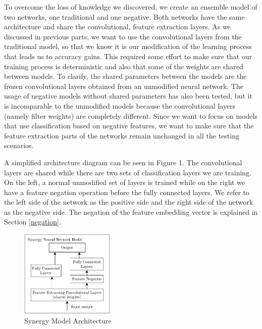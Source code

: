 \documentclass[b5paper]{book}
\begin{document}
To overcome the loss of knowledge we discovered, we create an ensemble model of two networks, one traditional and one negative. Both networks have the same architecture and share the convolutional, feature extraction layers. As we discussed in previous parts, we want to use the convolutional layers from the traditional model, so that we know it is our modification of the learning process that leads us to accuracy gains. This required some effort to make sure that our training process is deterministic and also that some of the weights are shared between models. To clarify, the shared parameters between the models are the frozen convolutional layers obtained from an unmodified neural network. The usage of negative models without shared parameters has also been tested, but it is incomparable to the unmodified models because the convolutional layers (namely filter weights) are completely different. Since we want to focus on models that use classification based on negative features, we want to make sure that the feature extraction parts of the networks remain unchanged in all the testing scenarios.

A simplified architecture diagram can be seen in Figure 1. The convolutional layers are shared while there are two sets of classification layers we are training. On the left, a normal unmodified set of layers is trained while on the right we have a feature negation operation before the fully connected layers. We refer to the left side of the network as the positive side and the right side of the network as the negative side. The negation of the feature embedding vector is explained in Section \ref{negation}.

\begin{figure}
\centering
  \includegraphics[width=0.4\textwidth]{figures/fig1.pdf}
\caption{Synergy Model Architecture}
\label{fig:1}       %
\end{figure}
\end{document}
